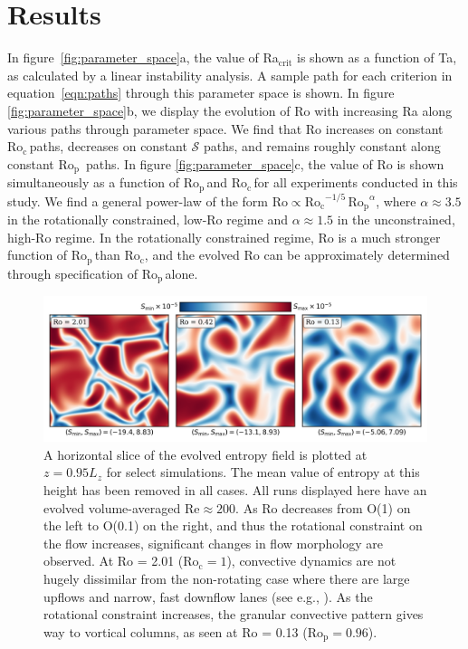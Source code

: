 \documentclass[twocolumn, amsmath, amsfonts, amssymb]{aastex62}
\newcommand{\pro}{\ensuremath{\text{Ro}_{\text{p}}}}
\newcommand{\con}{\ensuremath{\text{Ro}_{\text{c}}}}
\begin{document}
\section{Results}
\label{sec:results}
In figure~\ref{fig:parameter_space}a, the value of Ra$_{\text{crit}}$
is shown as a function of Ta, as
calculated by a linear instability analysis. A sample path for
each criterion in equation~\ref{eqn:paths} through
this parameter space is shown.
In figure \ref{fig:parameter_space}b, we display the evolution of Ro
with increasing Ra along various paths through parameter space.
We find that Ro increases on constant \con$\,$paths, decreases on constant $\mathcal{S}$
paths, and remains roughly constant along constant \pro$\,$ paths.
In figure \ref{fig:parameter_space}c, the value of Ro is shown simultaneously as
a function of \pro$\,$and \con$\,$for all experiments conducted in this study.
We find a general power-law of the form \mbox{$\text{Ro} \propto \con^{-1/5}\,\pro^{\alpha}$},
where $\alpha \approx 3.5$ in the rotationally constrained, low-Ro regime and
\mbox{$\alpha \approx 1.5$} in the unconstrained, high-Ro regime. 
In the rotationally constrained regime, Ro is a much stronger function of 
$\pro\,$than $\con$, and the
evolved Ro can be approximately determined through specification of \pro$\,$alone.


\begin{figure}[t]
    \includegraphics[width=\textwidth]{dynamics_plot.png}
    \caption{ A horizontal slice of the evolved entropy field is plotted at $z = 0.95L_z$
    for select simulations. The mean value of entropy at this height has been removed in all
    cases. All runs displayed here have an evolved volume-averaged $\text{Re} \approx 200$. 
    As Ro decreases from O(1) on the left to O(0.1) on the right, and thus the rotational
    constraint on the flow increases, significant changes in flow morphology are observed.
    At Ro = 2.01 ($\con = 1$), convective dynamics are not hugely dissimilar from the non-rotating
    case where there are large upflows and narrow, fast downflow lanes (see e.g., \AB).
    As the rotational constraint increases, the granular convective pattern gives way
    to vortical columns, as seen at Ro = 0.13 ($\pro = 0.96$).
    \label{fig:pretty_convection} }
\end{figure}
\end{document}
